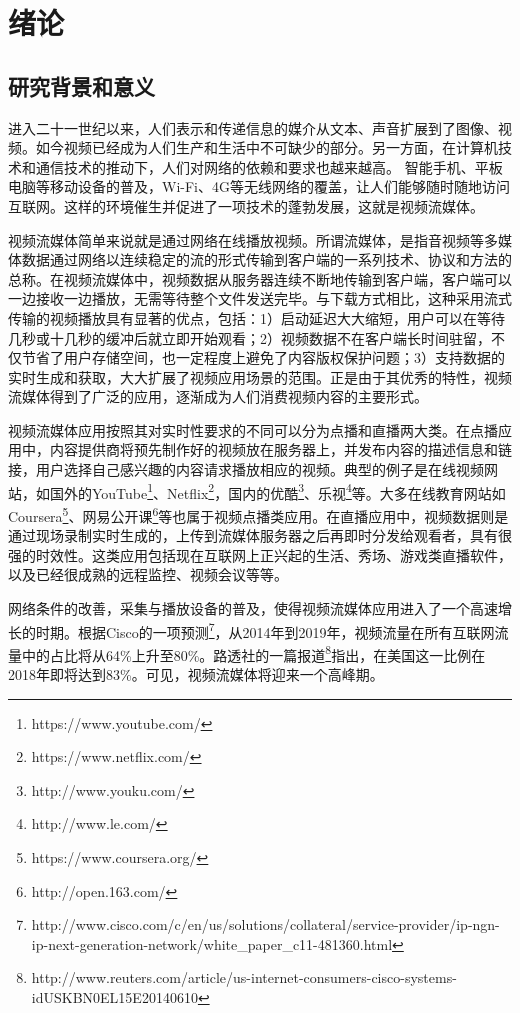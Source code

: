 \chapter{绪论}

\section{研究背景和意义}

进入二十一世纪以来，人们表示和传递信息的媒介从文本、声音扩展到了图像、视频。如今视频已经成为人们生产和生活中不可缺少的部分。另一方面，在计算机技术和通信技术的推动下，人们对网络的依赖和要求也越来越高。
智能手机、平板电脑等移动设备的普及，Wi-Fi、4G等无线网络的覆盖，让人们能够随时随地访问互联网。这样的环境催生并促进了一项技术的蓬勃发展，这就是视频流媒体。

视频流媒体简单来说就是通过网络在线播放视频。所谓流媒体，是指音视频等多媒体数据通过网络以连续稳定的流的形式传输到客户端的一系列技术、协议和方法的总称。在视频流媒体中，视频数据从服务器连续不断地传输到客户端，客户端可以一边接收一边播放，无需等待整个文件发送完毕。与下载方式相比，这种采用流式传输的视频播放具有显著的优点\supercite{Li2002}，包括：1）启动延迟大大缩短，用户可以在等待几秒或十几秒的缓冲后就立即开始观看；2）视频数据不在客户端长时间驻留，不仅节省了用户存储空间，也一定程度上避免了内容版权保护问题；3）支持数据的实时生成和获取，大大扩展了视频应用场景的范围。正是由于其优秀的特性，视频流媒体得到了广泛的应用，逐渐成为人们消费视频内容的主要形式\supercite{Chen2013}。

视频流媒体应用按照其对实时性要求的不同可以分为点播和直播两大类。在点播应用中，内容提供商将预先制作好的视频放在服务器上，并发布内容的描述信息和链接，用户选择自己感兴趣的内容请求播放相应的视频。典型的例子是在线视频网站，如国外的YouTube\footnote{https://www.youtube.com/}、Netflix\footnote{https://www.netflix.com/}，国内的优酷\footnote{http://www.youku.com/}、乐视\footnote{http://www.le.com/}等。大多在线教育网站如Coursera\footnote{https://www.coursera.org/}、网易公开课\footnote{http://open.163.com/}等也属于视频点播类应用。在直播应用中，视频数据则是通过现场录制实时生成的，上传到流媒体服务器之后再即时分发给观看者，具有很强的时效性。这类应用包括现在互联网上正兴起的生活、秀场、游戏类直播软件，以及已经很成熟的远程监控、视频会议等等。

网络条件的改善，采集与播放设备的普及，使得视频流媒体应用进入了一个高速增长的时期。根据Cisco的一项预测\footnote{http://www.cisco.com/c/en/us/solutions/collateral/service-provider/ip-ngn-ip-next-generation-network/white\_paper\_c11-481360.html}，从2014年到2019年，视频流量在所有互联网流量中的占比将从64\%上升至80\%。路透社的一篇报道\footnote{http://www.reuters.com/article/us-internet-consumers-cisco-systems-idUSKBN0EL15E20140610}指出，在美国这一比例在2018年即将达到83\%。可见，视频流媒体将迎来一个高峰期。

